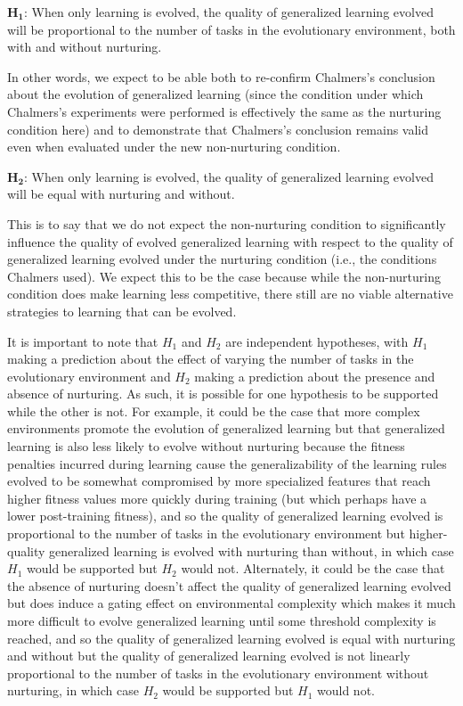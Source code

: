 \documentclass[master]{outhesis}
\begin{document}
$\mathbf{H_1}$: When only learning is evolved, the quality of generalized learning evolved will be proportional to the number of tasks in the evolutionary environment, both with and without nurturing.

In other words, we expect to be able both 
to re-confirm Chalmers's conclusion about the evolution of generalized learning
(since the condition under which Chalmers's experiments were performed is effectively the same as the nurturing condition here) 
and to demonstrate that Chalmers's conclusion remains valid even when evaluated under the new non-nurturing condition.

$\mathbf{H_2}$: When only learning is evolved, the quality of generalized learning evolved will be equal with nurturing and without.

This is to say that we do not expect the non-nurturing condition to significantly influence the quality of evolved generalized learning
with respect to the quality of generalized learning evolved under the nurturing condition (i.e., the conditions Chalmers used).
We expect this to be the case because while the non-nurturing condition does make learning less competitive,
there still are no viable alternative strategies to learning that can be evolved.

It is important to note that $H_1$ and $H_2$ are independent hypotheses,
with $H_1$ making a prediction about the effect of varying the number of tasks in the evolutionary environment
and $H_2$ making a prediction about the presence and absence of nurturing.
As such, it is possible for one hypothesis to be supported while the other is not.
For example, 
it could be the case that more complex environments promote the evolution of generalized learning 
but that generalized learning is also less likely to evolve without nurturing because the fitness penalties incurred during learning cause the generalizability of the learning rules evolved to be somewhat compromised by more specialized features that reach higher fitness values more quickly during training (but which perhaps have a lower post-training fitness),
and so the quality of generalized learning evolved is proportional to the number of tasks in the evolutionary environment
but higher-quality generalized learning is evolved with nurturing than without,
in which case $H_1$ would be supported but $H_2$ would not.
Alternately,
it could be the case that the absence of nurturing doesn't affect the quality of generalized learning evolved
but does induce a gating effect on environmental complexity which makes it much more difficult to evolve generalized learning until some threshold complexity is reached,
and so the quality of generalized learning evolved is equal with nurturing and without
but the quality of generalized learning evolved is not linearly proportional to the number of tasks in the evolutionary environment without nurturing,
in which case $H_2$ would be supported but $H_1$ would not. 
\end{document}
